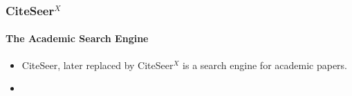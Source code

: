 
\begin{frame}
    \frametitle{CiteSeer${}^{X}$}
    \framesubtitle{The Academic Search Engine}
    \begin{itemize}
        \item CiteSeer, later replaced by CiteSeer${}^{X}$ is a search engine for academic papers.
        \item 
    \end{itemize}
\end{frame}